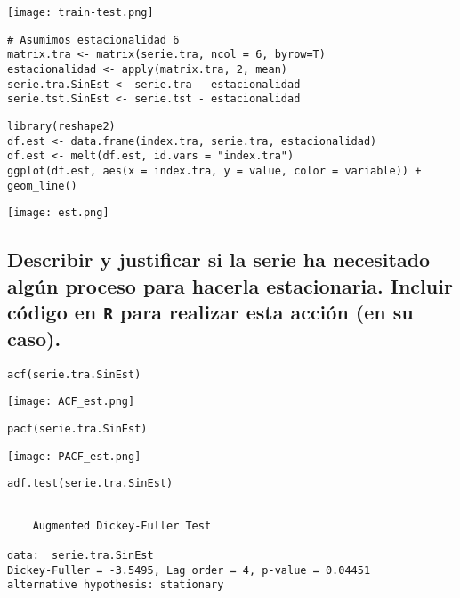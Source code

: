 \documentclass[11pt]{article}
\begin{document}
\begin{center}
\texttt{[image: train-test.png]}
\end{center}

\begin{verbatim}
# Asumimos estacionalidad 6
matrix.tra <- matrix(serie.tra, ncol = 6, byrow=T)
estacionalidad <- apply(matrix.tra, 2, mean)
serie.tra.SinEst <- serie.tra - estacionalidad
serie.tst.SinEst <- serie.tst - estacionalidad
\end{verbatim}

\begin{verbatim}
library(reshape2)
df.est <- data.frame(index.tra, serie.tra, estacionalidad)
df.est <- melt(df.est, id.vars = "index.tra")
ggplot(df.est, aes(x = index.tra, y = value, color = variable)) + geom_line()
\end{verbatim}

\begin{center}
\texttt{[image: est.png]}
\end{center}


\subsection{Describir y justificar si la serie ha necesitado algún proceso para hacerla estacionaria. Incluir código en \texttt{R} para realizar esta acción (en su caso).}
\label{sec:org593f867}


\begin{verbatim}
acf(serie.tra.SinEst)
\end{verbatim}

\begin{center}
\texttt{[image: ACF\_est.png]}
\end{center}


\begin{verbatim}
pacf(serie.tra.SinEst)
\end{verbatim}

\begin{center}
\texttt{[image: PACF\_est.png]}
\end{center}



\begin{verbatim}
adf.test(serie.tra.SinEst)
\end{verbatim}

\begin{verbatim}

	Augmented Dickey-Fuller Test

data:  serie.tra.SinEst
Dickey-Fuller = -3.5495, Lag order = 4, p-value = 0.04451
alternative hypothesis: stationary
\end{verbatim}
\end{document}
